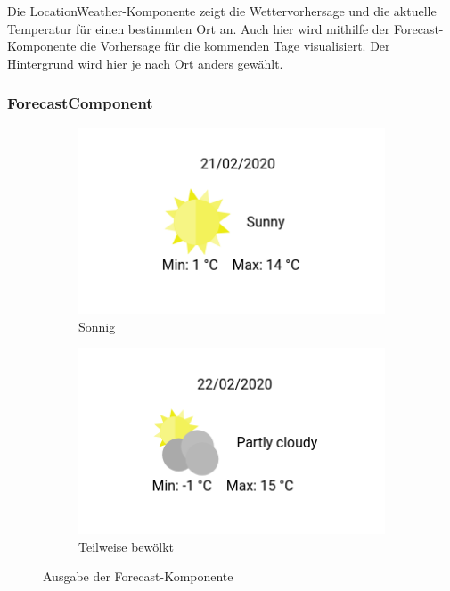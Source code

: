 \documentclass[a4paper,12pt]{article}
\begin{document}
Die LocationWeather-Komponente zeigt die Wettervorhersage und die aktuelle
Temperatur für einen bestimmten Ort an. Auch hier wird mithilfe der Forecast-Komponente
die Vorhersage für die kommenden Tage visualisiert. Der Hintergrund wird hier
je nach Ort anders gewählt.

\subsubsection{ForecastComponent}
\begin{figure}[H]
    \centering
    \begin{subfigure}[b]{0.4\linewidth}
        \includegraphics[width=\linewidth]{assets/forecast1.png}
        \caption{Sonnig}
    \end{subfigure}
    \begin{subfigure}[b]{0.4\linewidth}
        \includegraphics[width=\linewidth]{assets/forecast2.png}
        \caption{Teilweise bewölkt}
    \end{subfigure}
    \caption{Ausgabe der Forecast-Komponente}
    \label{fig:forecast}
\end{figure}
\end{document}
